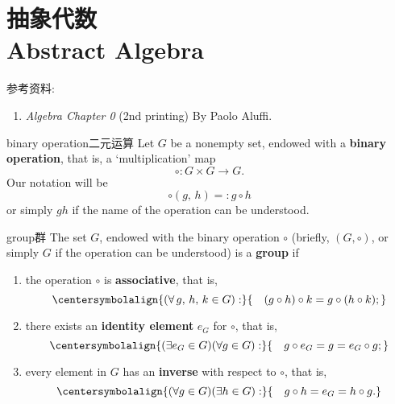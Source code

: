 
\section{抽象代数 \\Abstract Algebra}

参考资料:
\begin{enumerate}
	\item \textit{Algebra Chapter 0} (2nd printing) By Paolo Aluffi.
\end{enumerate}

\begin{defbox}{binary operation}{二元运算}
	Let $G$ be a nonempty set, endowed with a \textbf{binary operation}, that is, a `multiplication' map
	\[
		\circ : G \times G \to G.
	\]
	Our notation will be
	\[
		\circ (g,\,h) =: g \circ h
	\]
	or simply $gh$ if the name of the operation can be understood.
\end{defbox}

\begin{defbox}{group}{群}
	The set $G$, endowed with the binary operation $\circ$ (briefly, $(G,\circ)$, or simply $G$ if the operation can be understood) is a \textbf{group} if
	\begin{enumerate}
		\item the operation $\circ$ is \textbf{associative}, that is,
		\[
			\centersymbolalign{(\forall\,g,\,h,\,k \in G):}{\quad(g \circ h) \circ k = g \circ (h \circ k);}
		\]
		\item there exists an \textbf{identity element} $e_G$ for $\circ$, that is,
		\[
			\centersymbolalign{(\exists e_G \in G)(\forall g \in G):}{\quad g \circ e_G = g = e_G \circ g;}
		\]
		\item every element in $G$ has an \textbf{inverse} with respect to $\circ$, that is,
		\[
			\centersymbolalign{(\forall g \in G)(\exists h \in G):}{\quad g \circ h = e_G = h \circ g.}
		\]
	\end{enumerate}
\end{defbox}

